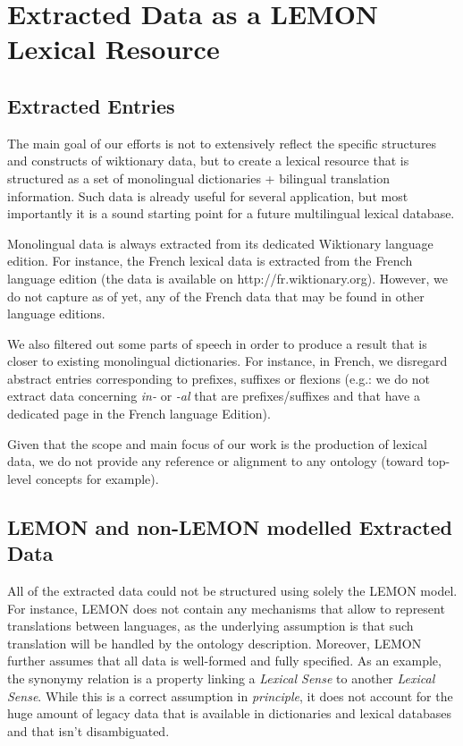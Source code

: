 \documentclass[10pt, a4paper]{article}
\begin{document}
\section{Extracted Data as a LEMON Lexical Resource}

\subsection{Extracted Entries}

The main goal of our efforts is not to extensively reflect the specific structures and constructs of wiktionary data, but to create a lexical resource that is structured as a set of monolingual dictionaries + bilingual translation information. Such data is already useful for several application, but most importantly it is a sound starting point for a future multilingual lexical database.

Monolingual data is always extracted from its dedicated Wiktionary language edition. For instance, the French lexical data is extracted from the French language edition (the data is available on http://fr.wiktionary.org). However, we do not capture as of yet, any of the French data that may be found in other language editions.

We also filtered out some parts of speech in order to produce a result that is closer to existing monolingual dictionaries. For instance, in French, we disregard abstract entries corresponding to prefixes, suffixes or flexions (e.g.: we do not extract data concerning \textit{in-} or \textit{-al} that are prefixes/suffixes and that have a dedicated page in the French language Edition). 

Given that the scope and main focus of our work is the production of lexical data, we do not provide any reference or alignment to any ontology (toward top-level concepts for example).  

\subsection{LEMON and non-LEMON modelled Extracted Data}

All of the extracted data could not be structured using solely the LEMON model. For instance, LEMON does not contain any mechanisms that allow to represent translations between languages, as the underlying assumption is that such translation will be handled by the ontology description. Moreover, LEMON further assumes that all data is well-formed and fully specified. As an example, the synonymy relation is a property linking a \textit{Lexical Sense} to another \textit{Lexical Sense}. While this is a correct assumption in \textit{principle}, it does not account for the huge amount of legacy data that is available in dictionaries and lexical databases and that isn't disambiguated.
\end{document}
